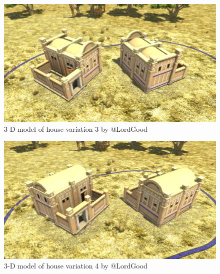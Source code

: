 \documentclass[a4paper,12pt]{scrreprt}
\begin{document}
\begin{figure}[H]
	\centering
	\includegraphics[width=\textwidth]{img/house/house_variation3}
	\caption{3-D model of house variation 3 by @LordGood}
\end{figure}

\begin{figure}[H]
	\centering
	\includegraphics[width=\textwidth]{img/house/house_variation4}
	\caption{3-D model of house variation 4 by @LordGood}
\end{figure}
\end{document}
